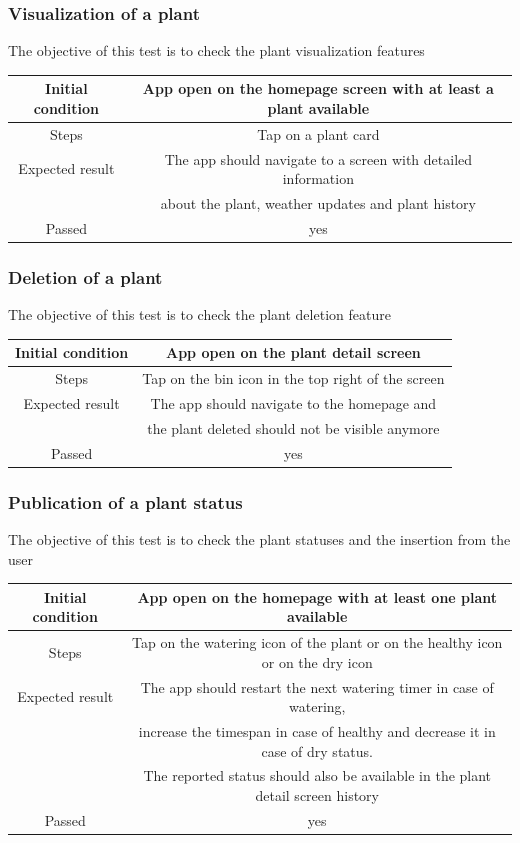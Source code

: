 \documentclass[10pt]{article}
\begin{document}
	\subsubsection{Visualization of a plant}
	The objective of this test is to check the plant visualization features
	\begin{center}
		\begin{tabular}{ |c|c| } 
			\hline
			Initial condition & App open on the homepage screen with at least a plant available\\
			\hline
			Steps & Tap on a plant card\\
			\hline
			Expected result & The app should navigate to a screen with detailed information\\
			& about the plant, weather updates and plant history\\
			\hline
			Passed & yes\\
			\hline
		\end{tabular}
	\end{center}
	\subsubsection{Deletion of a plant}
	The objective of this test is to check the plant deletion feature
	\begin{center}
		\begin{tabular}{ |c|c| } 
			\hline
			Initial condition & App open on the plant detail screen\\
			\hline
			Steps & Tap on the bin icon in the top right of the screen\\
			\hline
			Expected result & The app should navigate to the homepage and\\
			& the plant deleted should not be visible anymore\\
			\hline
			Passed & yes\\
			\hline
		\end{tabular}
	\end{center}
	\subsubsection{Publication of a plant status}
	The objective of this test is to check the plant statuses and the insertion from the user
	\begin{center}
		\begin{tabular}{ |c|c| } 
			\hline
			Initial condition & App open on the homepage with at least one plant available\\
			\hline
			Steps & Tap on the watering icon of the plant or on the healthy icon or on the dry icon\\
			\hline
			Expected result & The app should restart the next watering timer in case of watering,\\ & increase the timespan in case of healthy and decrease it in case of dry status.\\
			& The reported status should also be available in the plant detail screen history\\
			\hline
			Passed & yes\\
			\hline
		\end{tabular}
	\end{center}
	
\end{document}
